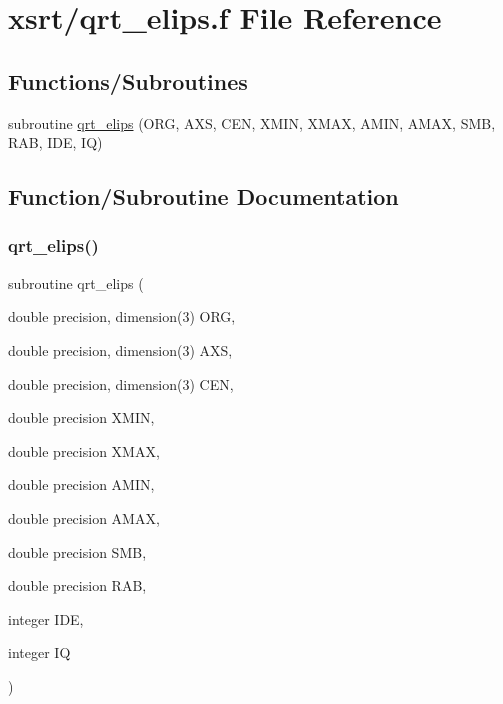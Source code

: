 \hypertarget{qrt__elips_8f}{}\section{xsrt/qrt\+\_\+elips.f File Reference}
\label{qrt__elips_8f}
\subsection*{Functions/\+Subroutines}
\begin{DoxyCompactItemize}
\item 
subroutine \hyperlink{qrt__elips_8f_a4b26ea966384db3314aabce2e9c28592}{qrt\+\_\+elips} (O\+RG, A\+XS, C\+EN, X\+M\+IN, X\+M\+AX, A\+M\+IN, A\+M\+AX, S\+MB, R\+AB, I\+DE, IQ)
\end{DoxyCompactItemize}


\subsection{Function/\+Subroutine Documentation}
\mbox{\label{qrt__elips_8f_a4b26ea966384db3314aabce2e9c28592}} 
\subsubsection{\texorpdfstring{qrt\+\_\+elips()}{qrt\_elips()}}
{\footnotesize\ttfamily subroutine qrt\+\_\+elips (\begin{DoxyParamCaption}\item[{double precision, dimension(3)}]{O\+RG,  }\item[{double precision, dimension(3)}]{A\+XS,  }\item[{double precision, dimension(3)}]{C\+EN,  }\item[{double precision}]{X\+M\+IN,  }\item[{double precision}]{X\+M\+AX,  }\item[{double precision}]{A\+M\+IN,  }\item[{double precision}]{A\+M\+AX,  }\item[{double precision}]{S\+MB,  }\item[{double precision}]{R\+AB,  }\item[{integer}]{I\+DE,  }\item[{integer}]{IQ }\end{DoxyParamCaption})}

